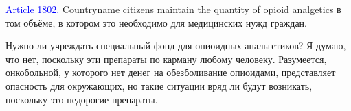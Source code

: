 \documentclass[11pt]{article}
\theoremstyle{remark}
\theoremstyle{definition}
\begin{document}
\color{black}
























\textcolor{blue}{Article 1802.} Countryname citizens maintain the quantity of opioid analgetics в том объёме, в котором это необходимо для медицинских нужд граждан. 



Нужно ли учреждать специальный фонд для опиоидных анальгетиков? Я думаю, что нет, поскольку эти препараты по карману любому человеку. Разумеется, онкобольной, у которого нет денег на обезболивание опиоидами, представляет опасность для окружающих, но такие ситуации вряд ли будут возникать, поскольку это недорогие препараты.






\end{document}
